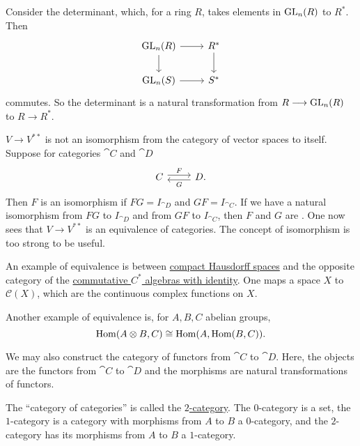 \documentclass[11pt, oneside]{article}
\begin{document}
Consider the determinant, which, for a ring $R$, takes elements in $\operatorname{GL}_n(R) $ to $R^*$. Then
\[
\begin{tikzcd}
\GL_n(R) \arrow[r] \arrow[d] & R^* \arrow[d]\\ \GL_n(S)  \arrow[r] & S^*
\end{tikzcd}
\]
commutes. So the determinant is a natural transformation from $R\longrightarrow \operatorname{GL}_n(R)$ to $R\longrightarrow R^*$.

$V\longrightarrow V^{**}$ is not an isomorphism from the category of vector spaces to itself. Suppose for categories $\cat C$ and $\cat D$
\[
\begin{tikzcd}
\cat C \arrow[r, shift left, "F"] & \cat D. \arrow[l, shift left, "G"]
\end{tikzcd}
\]
Then $F$ is an isomorphism if $FG = I_{\cat D}$ and $GF = I_{\cat C}$. If we have a natural isomorphism from $FG$ to $I_{\cat D}$ and from $GF$ to $I_{\cat C}$, then $F$ and $G$ are \href{https://en.wikipedia.org/wiki/Equivalence_of_categories}{}. One now sees that $V\longrightarrow V^{**}$ is an equivalence of categories. The concept of isomorphism is too strong to be useful.

An example of equivalence is \href{https://en.wikipedia.org/wiki/Gelfand_representation}{} between \href{https://en.wikipedia.org/wiki/Compact_space}{\color{black}compact Hausdorff spaces} and the opposite category of the \href{https://en.wikipedia.org/wiki/C*-algebra}{\color{black}commutative $C^*$ algebras with identity}. One maps a space $X$ to $\mathscr{C}(X)$, which are the continuous complex functions on $X$.  %

Another example of equivalence is, for $A,B,C$ abelian groups, 
$$
\operatorname{Hom}(A\otimes B, C) \cong \operatorname{Hom}(A, \operatorname{Hom}(B,C)).
$$

We may also construct the category of functors from $\cat C$ to $\cat D$. Here, the objects are the functors from $\cat C$ to $\cat D$ and the morphisms are natural transformations of functors.

The ``category of categories'' is called the \href{https://en.wikipedia.org/wiki/Strict_2-category}{\color{black}$2$-category}. The $0$-category is a set, the $1$-category is a category with morphisms from $A$ to $B$ a $0$-category, and the $2$-category has its morphisms from $A$ to $B$ a $1$-category.  
\end{document}

